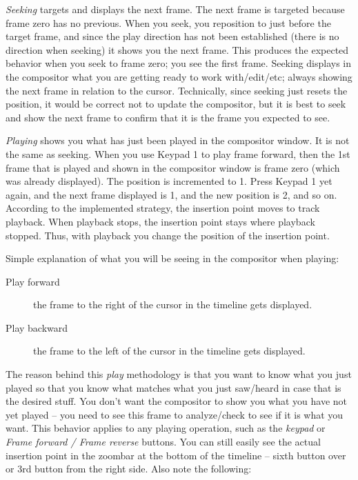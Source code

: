 \textit{Seeking} targets and displays the next frame.  The next frame is targeted because frame zero has no previous.  When you seek, you reposition to just before the target frame, and since the play direction has not been established (there is no direction when seeking) it shows you the next frame.  This produces the expected behavior when you seek to frame zero; you see the first frame.  Seeking displays in the compositor what you are getting ready to work with/edit/etc; always showing the next frame in relation to the cursor. Technically, since seeking just resets the position, it would be correct not to update the compositor, but it is best to seek and show the next frame to confirm that it is the frame you expected to see.

\textit{Playing} shows you what has just been played in the compositor window.  It is not the same as seeking. When you use Keypad 1 to play frame forward, then the 1st frame that is played and shown in the compositor window is frame zero (which was already displayed).  The position is incremented to 1.  Press Keypad 1 yet again, and the next frame displayed is 1, and the new position is 2, and so on.  According to the implemented strategy, the insertion point moves to track playback.  When playback stops, the insertion point stays where playback stopped.  Thus, with playback you change the position of the insertion point.

Simple explanation of what you will be seeing in the compositor when playing:

\begin{description}
    \item[Play forward] the frame to the right of the cursor in the timeline gets displayed.
    \item[Play backward] the frame to the left of the cursor in the timeline gets displayed.
\end{description}

The reason behind this \textit{play} methodology is that you want to know what you just played so that you know what matches what you just saw/heard in case that is the desired stuff.   You don't want the compositor to show you what you have not yet played -- you need to see this frame to analyze/check to see if it is what you want.  This behavior applies to any playing operation, such as the \textit{keypad} or \textit{Frame forward / Frame reverse} buttons.  You can still easily see the actual insertion point in the zoombar at the bottom of the timeline -- sixth button over or 3rd button from the right side.   Also note the following:

